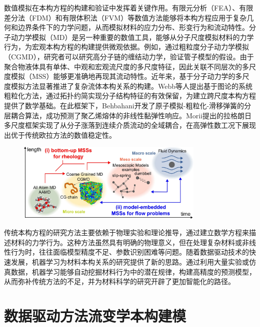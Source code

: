 数值模拟在本构方程的构建和验证中发挥着关键作用。有限元分析（FEA）、有限差分法（FDM）和有限体积法（FVM）等数值方法能够将本构方程应用于复杂几何和边界条件下的力学问题，从而模拟材料的应力分布、形变行为和流动特性\cite{alvesNumericalMethodsViscoelastic2021}。分子动力学模拟（MD）是另一种重要的数值工具，能够从分子尺度模拟材料的力学行为，为宏观本构方程的构建提供微观依据。例如，通过粗粒度分子动力学模拟（CGMD），研究者可以研究高分子链的缠结动力学，验证管子模型的假设\cite{li2023coupling,sgouros2017slip}。由于聚合物液体具有单体、中观和宏观流尺度的多尺度特征，因此关联不同层次的多尺度模拟（MSS）能够更准确地再现其流动特性\cite{satoRecentDevelopmentsMultiscale2024}。近年来，基于分子动力学的多尺度模拟方法显著推进了复杂流体本构关系的构建。Webb等人提出基于图论的系统粗粒化方法，通过拓扑约简实现分子结构特征的有效保留，为建立跨尺度本构方程提供了数学基础\cite{webb2018graph}。在此框架下，Behbahani开发了原子模拟-粗粒化-滑移弹簧的分层耦合算法，成功预测了聚乙烯熔体的非线性黏弹性响应\cite{behbahani2021dynamics}。Morii提出的拉格朗日多尺度框架实现了从分子涨落到连续介质流动的全域耦合，在高弹性数工况下展现出优于传统欧拉方法的数值稳定性\cite{morii2021lagrangian}。
\begin{figure}[htbp]
  \centering
  \includegraphics[width=0.8\textwidth]{Fig/duochidumoni.png}
\end{figure}

传统本构方程的研究方法主要依赖于物理实验和理论推导，通过建立数学方程来描述材料的力学行为。这种方法虽然具有明确的物理意义，但在处理复杂材料或非线性行为时，往往面临模型精度不足、参数识别困难等问题\cite{amamotoDatadrivenApproachesStructureproperty2022}。随着数据驱动技术的快速发展，机器学习为材料本构关系的研究提供了新的思路。通过利用大量实验或仿真数据，机器学习能够自动挖掘材料行为中的潜在规律，构建高精度的预测模型，从而弥补传统方法的不足，并为材料科学的研究开辟了更加智能化的路径。
\section{数据驱动方法流变学本构建模}
